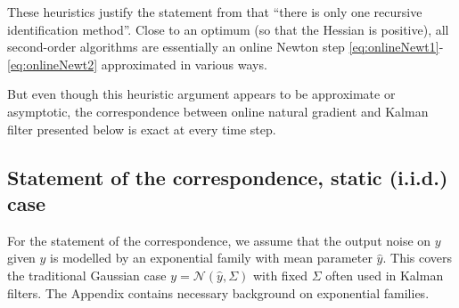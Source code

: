 \documentclass[11pt,a4paper]{article}
\newcommand{\deq}{\mathrel{\mathop{:}}=}
\newcommand{\E}{\mathbb{E}}
\newcommand{\1}{\mathbbm{1}}
\theoremstyle{yannthm}
\theoremstyle{yannthm2}
\newcommand{\transp}[1]{#1^{\!\top}\!}
\newcommand{\gaussian}{\mathcal{N}}
\numberwithin{equation}{section}
\begin{document}
These heuristics justify the statement from \cite{ljung83} that ``there is
only one recursive identification method''. Close to an optimum (so that
the Hessian is positive), all second-order algorithms are essentially an
online Newton step \eqref{eq:onlineNewt1}-\eqref{eq:onlineNewt2}
approximated in various ways.

But even though this heuristic argument appears to be approximate or asymptotic, the
correspondence between online natural gradient and Kalman filter
presented below is exact at every time step.

\subsection{Statement of the correspondence, static (i.i.d.) case}
\label{sec:statement}

For the statement of the correspondence, we assume
that the output noise on $y$
given $\hat y$ is modelled by an exponential family with mean parameter
$\hat y$. This covers the traditional Gaussian case
$y=\gaussian(\hat y,\Sigma)$ with fixed $\Sigma$ often used in Kalman
filters. The Appendix contains necessary background on exponential
families.

% 
\end{document}
